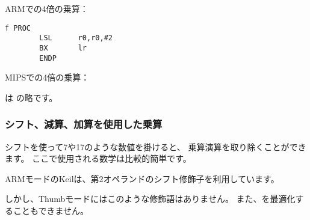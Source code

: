 ARMでの4倍の乗算：

\begin{lstlisting}[caption=\NonOptimizingKeilVI (\ARMMode),style=customasmARM]
f PROC
        LSL      r0,r0,#2
        BX       lr
        ENDP
\end{lstlisting}

MIPSでの4倍の乗算：



 は の略です。

\subsubsection{シフト、減算、加算を使用した乗算}
\label{multiplication_using_shifts_adds_subs}

シフトを使って7や17のような数値を掛けると、
乗算演算を取り除くことができます。
ここで使用される数学は比較的簡単です。








ARMモードのKeilは、第2オペランドのシフト修飾子を利用しています。



しかし、Thumbモードにはこのような修飾語はありません。 
また、を最適化することもできません。










